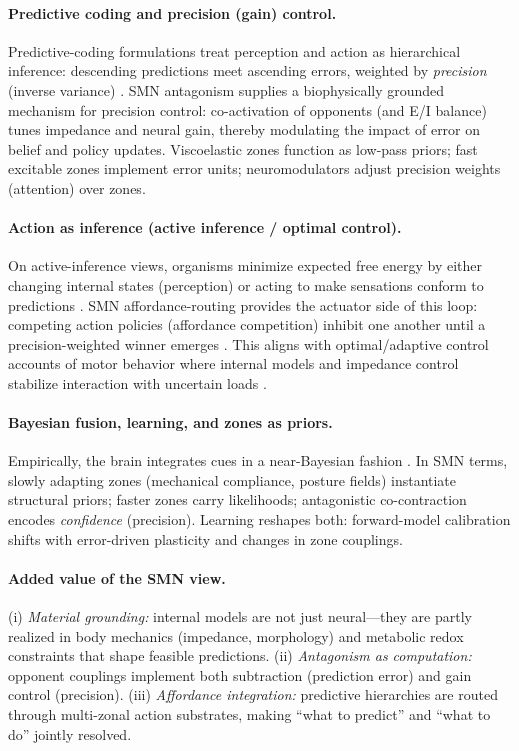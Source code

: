 \paragraph{Predictive coding and precision (gain) control.}
Predictive-coding formulations treat perception and action as hierarchical inference: descending predictions meet ascending errors, weighted by \emph{precision} (inverse variance) \citep{RaoBallard1999_PredictiveCoding,Friston2005_HierarchicalInference,Friston2010_FreeEnergy}. SMN antagonism supplies a biophysically grounded mechanism for precision control: co-activation of opponents (and E/I balance) tunes impedance and neural gain, thereby modulating the impact of error on belief and policy updates. Viscoelastic zones function as low-pass priors; fast excitable zones implement error units; neuromodulators adjust precision weights (attention) over zones.

\paragraph{Action as inference (active inference / optimal control).}
On active-inference views, organisms minimize expected free energy by either changing internal states (perception) or acting to make sensations conform to predictions \citep{AdamsShippFriston2013_ActiveInference,Friston2011_Agent}. SMN affordance-routing provides the actuator side of this loop: competing action policies (affordance competition) inhibit one another until a precision-weighted winner emerges \citep{Cisek2007_AffordanceCompetition}. This aligns with optimal/adaptive control accounts of motor behavior where internal models and impedance control stabilize interaction with uncertain loads \citep{TodorovJordan2002_OCShaping,Hogan1984_ImpedanceControl,ShadmehrMussaIvaldi1994_InternalModels}.

\paragraph{Bayesian fusion, learning, and zones as priors.}
Empirically, the brain integrates cues in a near-Bayesian fashion \citep{ErnstBanks2002_Bayesian,KordingWolpert2004_Bayesian,KnillPouget2004_Bayes}. In SMN terms, slowly adapting zones (mechanical compliance, posture fields) instantiate structural priors; faster zones carry likelihoods; antagonistic co-contraction encodes \emph{confidence} (precision). Learning reshapes both: forward-model calibration shifts with error-driven plasticity and changes in zone couplings.

\paragraph{Added value of the SMN view.}
(i) \emph{Material grounding:} internal models are not just neural—they are partly realized in body mechanics (impedance, morphology) and metabolic redox constraints that shape feasible predictions. (ii) \emph{Antagonism as computation:} opponent couplings implement both subtraction (prediction error) and gain control (precision). (iii) \emph{Affordance integration:} predictive hierarchies are routed through multi-zonal action substrates, making “what to predict” and “what to do” jointly resolved.
